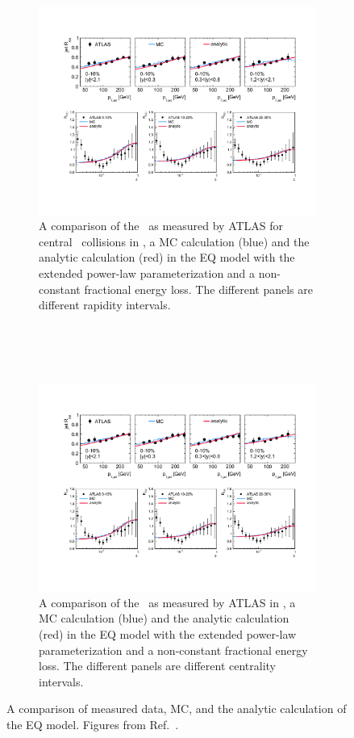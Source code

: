 \begin{figure}
\begin{subfigure}{1\textwidth}
  \centering
\includegraphics[width=1\textwidth]{figures/jetMeasurements/EQ_RAA}
\caption{A comparison of the \RAA\ as measured by ATLAS for central \pbpb\ collisions in \cite{Aad:2014bxa}, a MC calculation (blue) and the analytic calculation (red) in the EQ model with the extended power-law parameterization and a non-constant fractional energy loss.
The different panels are different rapidity intervals.}
\label{fig:EQ_RAA}
\end{subfigure} \\ \\ \\
\begin{subfigure}{1\textwidth}
  \centering
\includegraphics[width=1\textwidth]{figures/jetMeasurements/eq_FF}
\caption{A comparison of the \Rdz\ as measured by ATLAS in \cite{Aad:2014wha}, a MC calculation (blue) and the analytic calculation (red) in the EQ model with the extended power-law parameterization and a non-constant fractional energy loss.
The different panels are different centrality intervals.}
\label{fig:EQ_FF}
\end{subfigure}
\caption{A comparison of measured data, MC, and the analytic calculation of the EQ model.
Figures from Ref.~\cite{Spousta:2015fca}.}
\label{fig:EQ_modification}
\end{figure}

